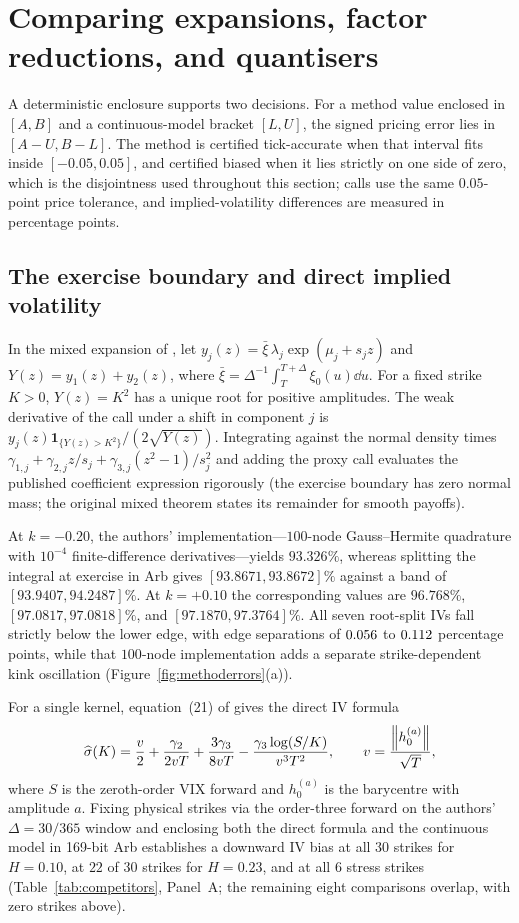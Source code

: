 \section{Comparing expansions, factor reductions, and quantisers}\label{sec:methods_vtwo}
A deterministic \RoughCert{} enclosure supports two decisions. For a method value enclosed in $[A,B]$ and a
continuous-model bracket $[L,U]$, the signed pricing error lies in $[A-U,B-L]$. The method is certified
tick-accurate when that interval fits inside $[-0.05,0.05]$, and certified biased when it lies strictly on
one side of zero, which is the disjointness used throughout this section; calls use the same $0.05$-point
price tolerance, and implied-volatility differences are measured in percentage points.

\subsection{The exercise boundary and direct implied volatility}\label{sec:direct_expansion}
In the mixed expansion of \citet[Theorem~3.1]{BourgeyDeMarcoGobet2023}, let
$y_j(z)=\bar\xi\,\lambda_j\exp(\mu_j+s_jz)$ and $Y(z)=y_1(z)+y_2(z)$, where
$\bar\xi=\Delta^{-1}\int_T^{T+\Delta}\xi_0(u)\dd u$. For a fixed strike $K>0$, $Y(z)=K^2$ has a unique root
for positive amplitudes. The weak derivative of the call under a shift in component $j$ is
$y_j(z)\mathbf{1}_{\{Y(z)>K^2\}}/(2\sqrt{Y(z)})$. Integrating against the normal density times
$\gamma_{1,j}+\gamma_{2,j}z/s_j+\gamma_{3,j}(z^2-1)/s_j^2$ and adding the proxy call evaluates the
published coefficient expression rigorously (the exercise boundary has zero normal mass; the original mixed
theorem states its remainder for smooth payoffs).

At $k=-0.20$, the authors' implementation---$100$-node Gauss--Hermite quadrature with $10^{-4}$
finite-difference derivatives---yields $93.326\%$, whereas splitting
the integral at exercise in Arb gives $[93.8671,93.8672]\%$ against a \RoughCertCV{} band of
$[93.9407,94.2487]\%$. At $k=+0.10$ the corresponding values are $96.768\%$, $[97.0817,97.0818]\%$, and
$[97.1870,97.3764]\%$. All seven root-split IVs fall strictly below the lower edge, with edge separations of $0.056$ to
$0.112$ percentage points, while that $100$-node implementation adds a separate strike-dependent
kink oscillation (Figure~\ref{fig:methoderrors}(a)).

For a single kernel, equation~(21) of \citet{LiaoAgarwalBourgey2026} gives the direct IV formula
\[
 \widehat\sigma(K)=\frac{v}{2}+\frac{\gamma_2}{2vT}+\frac{3\gamma_3}{8vT}
                 -\frac{\gamma_3\log(S/K)}{v^3T^2},
 \qquad v=\frac{\left\lVert h_0^{(a)}\right\rVert}{\sqrt{T}},
\]
where $S$ is the zeroth-order VIX forward and $h_0^{(a)}$ is the barycentre with amplitude $a$. Fixing
physical strikes via the order-three forward on the authors' $\Delta=30/365$ window and enclosing both
the direct formula and the continuous model in 169-bit Arb establishes a downward IV bias at all $30$
strikes for $H=0.10$, at $22$ of $30$ strikes for $H=0.23$, and at all $6$ stress strikes
(Table~\ref{tab:competitors}, Panel~A; the remaining eight comparisons overlap, with zero strikes above).

